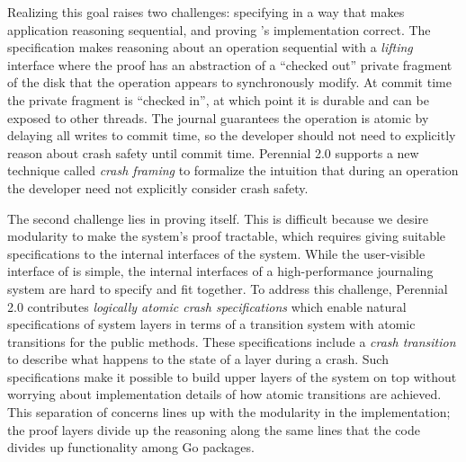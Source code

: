 Realizing this goal raises two challenges: specifying \txn in a way that makes
application reasoning sequential, and proving \txn's implementation correct. The
specification makes reasoning about an operation sequential with a
\emph{lifting} interface where the proof has an abstraction of a ``checked out''
private fragment of the disk that the operation appears to synchronously modify.
At commit time the private fragment is ``checked in'', at which point it is
durable and can be exposed to other threads. The journal guarantees the
operation is atomic by delaying all writes to commit time, so the developer
should not need to explicitly reason about crash safety until commit time.
Perennial 2.0 supports a new technique called \emph{crash framing} to formalize
the intuition that during an operation the developer need not explicitly
consider crash safety.

The second challenge lies in proving \txn itself.  This is
difficult because we desire modularity to make the system's proof tractable,
which requires giving suitable specifications to the internal interfaces of the system.
While the user-visible interface of \txn is simple, the
internal interfaces of a high-performance journaling system are
hard to specify and fit together.
To address this challenge, Perennial 2.0 contributes \emph{logically atomic crash
  specifications} which enable natural specifications of system layers in terms of
a transition system with
atomic transitions for the public methods.
These specifications include a \emph{crash transition}
to describe what happens to the state of a layer during a crash.
Such specifications make it possible to build upper layers of the system on top without
worrying about implementation details of how atomic transitions are achieved.
This separation of concerns lines up with the modularity in the implementation;
the proof layers divide up the reasoning along the same lines that the
code divides up functionality among Go packages.


